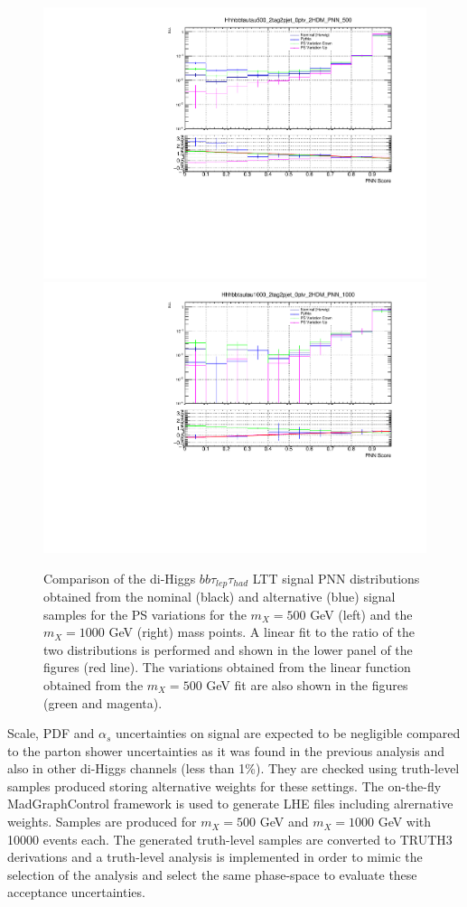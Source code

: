 \begin{figure}
\centering
\includegraphics[width=.49\textwidth]{figures/systs/LepHad_Signal_LTT_500_psSysts_PNN_Fit_Logy.pdf}
\includegraphics[width=.49\textwidth]{figures/systs/LepHad_Signal_LTT_1000_psSysts_PNN_Fit_Logy.pdf}
\caption{Comparison of the di-Higgs $bb\tau_{lep}\tau_{had}$ LTT signal PNN distributions obtained from the nominal (black) and alternative (blue) signal samples for the PS variations for the  $m_X= 500$ GeV (left) and the $m_X=1000$ GeV (right) mass points. A linear fit to the ratio of the two distributions is performed and shown in the lower panel of the figures (red line). The variations obtained from the linear function obtained from the $m_X= 500$ GeV fit are also shown in the figures (green and magenta).}
\label{fig:LepHadLTTSignalSysts}
\end{figure}


Scale, PDF and $\alpha_s$ uncertainties on signal are expected to be negligible compared to the parton shower uncertainties as it was found in the previous analysis and also in other di-Higgs channels (less than 1\%). They are checked using truth-level samples produced storing alternative weights for these settings. The on-the-fly MadGraphControl framework is used to generate LHE files including alrernative weights. Samples are produced for $m_X=500$ GeV and $m_X=1000$ GeV with 10000 events each. The generated truth-level samples are converted to TRUTH3 derivations and a truth-level analysis is implemented in order to mimic the selection of the analysis and select the same phase-space to evaluate these acceptance uncertainties.


